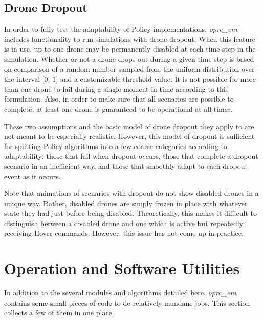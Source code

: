 \subsection{Drone Dropout}

In order to fully test the adaptability of Policy implementations, \textit{oprc\_env} includes functionality to run simulations with drone dropout. When this feature is in use, up to one drone may be permanently disabled at each time step in the simulation. Whether or not a drone drops out during a given time step is based on comparison of a random number sampled from the uniform distribution over the interval [0, 1] and a customizable threshold value. It is not possible for more than one drone to fail during a single moment in time according to this formulation. Also, in order to make sure that all scenarios are possible to complete, at least one drone is guaranteed to be operational at all times. 

These two assumptions and the basic model of drone dropout they apply to are not meant to be especially realistic. However, this model of dropout is sufficient for splitting Policy algorithms into a few coarse categories according to adaptability: those that fail when dropout occurs, those that complete a dropout scenario in an inefficient way, and those that smoothly adapt to each dropout event as it occurs. 

Note that animations of scenarios with dropout do not show disabled drones in a unique way. Rather, disabled drones are simply frozen in place with whatever state they had just before being disabled. Theoretically, this makes it difficult to distinguish between a disabled drone and one which is active but repeatedly receiving Hover commands. However, this issue has not come up in practice.


\section{Operation and Software Utilities}

In addition to the several modules and algorithms detailed here, \textit{oprc\_env} contains some small pieces of code to do relatively mundane jobs. This section collects a few of them in one place.

